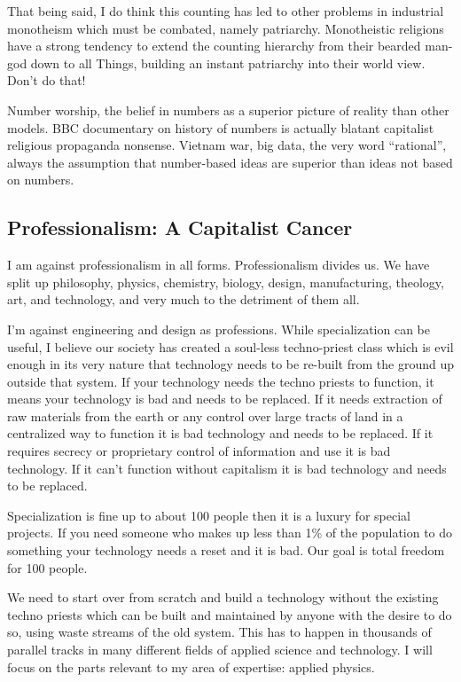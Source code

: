 That being said, I do think this counting has led to other problems in
industrial monotheism which must be combated, namely patriarchy.
Monotheistic religions have a strong tendency to extend the counting
hierarchy from their bearded man-god down to all Things, building an
instant patriarchy into their world view. Don't do that!

Number worship, the belief in numbers as a superior picture of reality
than other models. BBC documentary on history of numbers is actually
blatant capitalist religious propaganda nonsense. Vietnam war, big data,
the very word ``rational'', always the assumption that number-based
ideas are superior than ideas not based on numbers.

\subsection{Professionalism: A Capitalist
Cancer}\label{professionalism-a-capitalist-cancer}

I am against professionalism in all forms. Professionalism divides us.
We have split up philosophy, physics, chemistry, biology, design,
manufacturing, theology, art, and technology, and very much to the
detriment of them all.

I'm against engineering and design as professions. While specialization
can be useful, I believe our society has created a soul-less
techno-priest class which is evil enough in its very nature that
technology needs to be re-built from the ground up outside that system.
If your technology needs the techno priests to function, it means your
technology is bad and needs to be replaced. If it needs extraction of
raw materials from the earth or any control over large tracts of land in
a centralized way to function it is bad technology and needs to be
replaced. If it requires secrecy or proprietary control of information
and use it is bad technology. If it can't function without capitalism it
is bad technology and needs to be replaced.

Specialization is fine up to about 100 people then it is a luxury for
special projects. If you need someone who makes up less than 1\% of the
population to do something your technology needs a reset and it is bad.
Our goal is total freedom for 100 people.

We need to start over from scratch and build a technology without the
existing techno priests which can be built and maintained by anyone with
the desire to do so, using waste streams of the old system. This has to
happen in thousands of parallel tracks in many different fields of
applied science and technology. I will focus on the parts relevant to my
area of expertise: applied physics.

